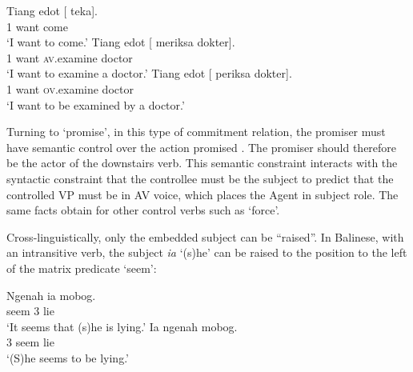 \documentclass[output=paper
	        ,collection
	        ,collectionchapter
 	        ,biblatex
                ,babelshorthands
                ,newtxmath
                ,draftmode
                ,colorlinks, citecolor=brown
]{./langsci/langscibook}
\begin{document}
\begin{exe}
\ex \begin{xlist}
\ex 
\gll Tiang edot [ \trace{} teka].\\
     1 want     {} {} come\\\hfill\citep[ex 25]{WechslerandArka1998}
\glt `I want to come.'
\ex 
\gll Tiang edot [ \trace{}  meriksa dokter].\\
     1     want {} {}     \textsc{av}.examine doctor\\
\glt `I want to examine a doctor.'
\ex 
\gll Tiang edot [ \trace{} periksa dokter].\\
     1     want {} {}    \textsc{ov}.examine doctor\\
\glt `I want to be examined by a doctor.'
\end{xlist}
\end{exe}

Turning to  `promise', in this type of commitment relation, the promiser must have semantic control over the action promised \citep{Farkas1988,Kroeger1993,SagandPollard1991}. The promiser should therefore be the actor of the downstairs verb. This semantic constraint interacts with the syntactic constraint that the controllee must be the subject to predict that the controlled VP must be in AV voice, which places the Agent in subject role. The same facts obtain for other control verbs such as  `force'.

\eal
{}
\zl

Cross-linguistically, only the embedded subject can be ``raised''. In Balinese, with an intransitive verb, the subject \emph{ia} `(s)he' can be raised to the position to the left of the matrix predicate  `seem':

\begin{exe}
\ex \begin{xlist}
\ex 
\gll Ngenah ia mobog.\\
     seem 3 lie\\\hfill\citep[ex 7]{WechslerandArka1998}
\glt `It seems that (s)he is lying.'
\ex 
\gll  Ia ngenah mobog.\\
      3 seem lie\\
\glt `(S)he seems to be lying.'
\end{xlist}
\end{exe}
\end{document}
